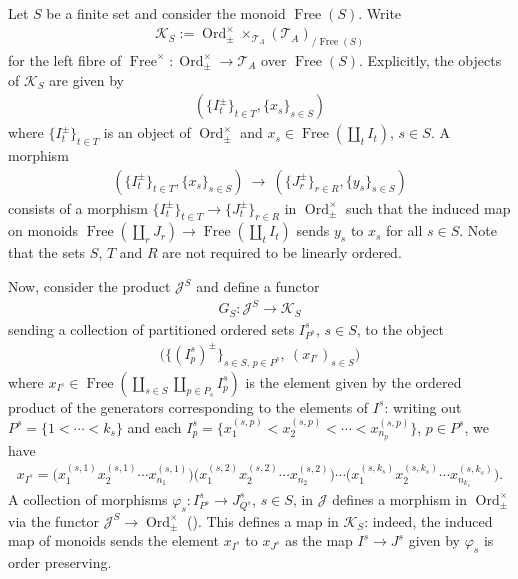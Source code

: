 \documentclass[12pt, reqno]{amsart}
\theoremstyle{plain}
\theoremstyle{definition}
\renewcommand{\phi}{\varphi}
\begin{document}
Let $S$ be a finite set and consider the monoid $\operatorname{Free}(S)$. Write
\begin{align*}
\mathcal{K}_S:=\operatorname{Ord}_\pm^\times \mathop{\times}_{\mathcal{T}_A} (\mathcal{T}_A)_{/\operatorname{Free}(S)}
\end{align*}
for the left fibre of $\operatorname{Free}^\times\colon \operatorname{Ord}_\pm^\times\rightarrow \mathcal{T}_A$ over $\operatorname{Free}(S)$. Explicitly, the objects of $\mathcal{K}_S$ are given by
\begin{align*}
(\{I_t^\pm\}_{t\in T},\{x_s\}_{s\in S})
\end{align*}
where $\{I_t^\pm\}_{t\in T}$ is an object of $\operatorname{Ord}_\pm^\times$ and $x_s\in \operatorname{Free}(\coprod_t I_t)$, $s\in S$. A morphism
\begin{align*}
(\{I_t^\pm\}_{t\in T},\{x_s\}_{s\in S})\ \longrightarrow\ (\{J_r^\pm\}_{r\in R},\{y_s\}_{s\in S})
\end{align*}
consists of a morphism $\{I_t^\pm\}_{t\in T}\rightarrow \{J_t^\pm\}_{r\in R}$ in $\operatorname{Ord}_\pm^\times$ such that the induced map on monoids $\operatorname{Free}(\coprod_r J_r)\rightarrow \operatorname{Free}(\coprod_t I_t)$ sends $y_s$ to $x_s$ for all $s\in S$. Note that the sets $S$, $T$ and $R$ are not required to be linearly ordered.

Now, consider the product $\mathcal{J}^S$ and define a functor
\begin{align*}
G_S\colon \mathcal{J}^S\rightarrow \mathcal{K}_S
\end{align*}
sending a collection of partitioned ordered sets $I^s_{P^s}$, $s\in S$, to the object
\begin{align*}
\big(\{(I^s_p)^\pm\}_{s\in S,\,p\in P^s},\  (x_{I^s})_{s\in S}\big)
\end{align*}
where $x_{I^s}\in \operatorname{Free}(\coprod_{s\in S}\coprod_{p\in P_s} I^s_p)$ is the element given by the ordered product of the generators corresponding to the elements of $I^s$: writing out $P^s=\{1<\cdots <k_s\}$ and each $I^s_p=\{x_1^{(s,p)}<x_2^{(s,p)}<\cdots < x_{n_p}^{(s,p)}\}$, $p\in P^s$, we have
\begin{align}\label{xI}
x_{I^s}=\bigg(x_{1}^{(s,1)}x_{2}^{(s,1)}\cdots x_{n_1}^{(s,1)}\bigg)\bigg(x_{1}^{(s,2)}x_{2}^{(s,2)}\cdots x_{n_2}^{(s,2)}\bigg)\cdots \bigg(x_{1}^{(s,k_s)}x_{2}^{(s,k_s)}\cdots x_{n_{k_s}}^{(s,k_s)}\bigg).
\end{align}
A collection of morphisms $\phi_s\colon I^s_{P^s}\rightarrow J^s_{Q^s}$, $s\in S$, in $\mathcal{J}$ defines a morphism in $\operatorname{Ord}_\pm^\times$ via the functor $\mathcal{J}^S\rightarrow \operatorname{Ord}_\pm^\times$ (). This defines a map in $\mathcal{K}_S$: indeed, the induced map of monoids sends the element $x_{I^s}$ to $x_{J^s}$ as the map $I^s\rightarrow J^s$ given by $\phi_s$ is order preserving.
\end{document}
